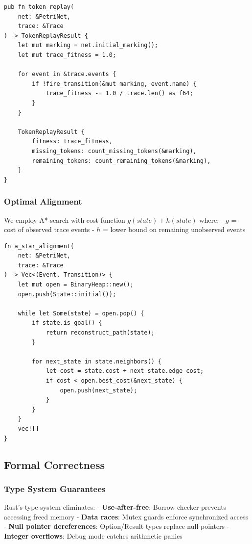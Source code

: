 \documentclass[11pt,twocolumn]{article}
\begin{document}
\begin{lstlisting}
pub fn token_replay(
    net: &PetriNet,
    trace: &Trace
) -> TokenReplayResult {
    let mut marking = net.initial_marking();
    let mut trace_fitness = 1.0;

    for event in &trace.events {
        if !fire_transition(&mut marking, event.name) {
            trace_fitness -= 1.0 / trace.len() as f64;
        }
    }

    TokenReplayResult {
        fitness: trace_fitness,
        missing_tokens: count_missing_tokens(&marking),
        remaining_tokens: count_remaining_tokens(&marking),
    }
}
\end{lstlisting}

\subsubsection{Optimal Alignment}
We employ A* search with cost function $g(state) + h(state)$ where:
- $g$ = cost of observed trace events
- $h$ = lower bound on remaining unobserved events

\begin{lstlisting}
fn a_star_alignment(
    net: &PetriNet,
    trace: &Trace
) -> Vec<(Event, Transition)> {
    let mut open = BinaryHeap::new();
    open.push(State::initial());

    while let Some(state) = open.pop() {
        if state.is_goal() {
            return reconstruct_path(state);
        }

        for next_state in state.neighbors() {
            let cost = state.cost + next_state.edge_cost;
            if cost < open.best_cost(&next_state) {
                open.push(next_state);
            }
        }
    }
    vec![]
}
\end{lstlisting}

\subsection{Formal Correctness}

\subsubsection{Type System Guarantees}
Rust's type system eliminates:
- \textbf{Use-after-free}: Borrow checker prevents accessing freed memory
- \textbf{Data races}: Mutex guards enforce synchronized access
- \textbf{Null pointer dereferences}: Option/Result types replace null pointers
- \textbf{Integer overflows}: Debug mode catches arithmetic panics
\end{document}
